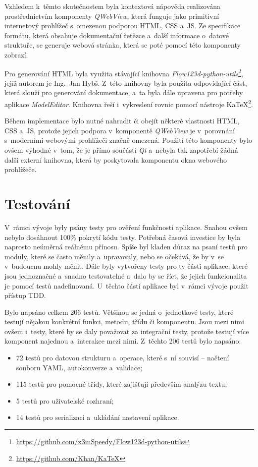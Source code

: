 \documentclass[FM,bw,DP]{tulthesis}
\begin{document}
Vzhledem k~těmto skutečnostem byla kontextová nápověda realizována pro\-střed\-nictvím komponenty \textit{QWebView}, která funguje jako primitivní internetový prohlížeč s~omezenou podporou \gls{HTML}, \gls{CSS} a~\gls{JS}. Ze specifikace formátu, která obsahuje dokumentační řetězce a~další informace o~datové struktuře, se generuje webová stránka, která se poté pomocí této komponenty zobrazí.

Pro generování HTML byla využita stávající knihovna \textit{Flow123d-python-utils\footnote{\url{https://github.com/x3mSpeedy/Flow123d-python-utils}}}, jejíž autorem je Ing.~Jan Hybš. Z~této knihovny byla použita odpovídající část, která slouží pro generování dokumentace, a~ta byla dále upravena pro potřeby aplikace \textit{ModelEditor}. Knihovna řeší i~vykreslení rovnic pomocí nástroje KaTeX\footnote{\url{https://github.com/Khan/KaTeX}}.

Během implementace bylo nutné nahradit či obejít některé vlastnosti \gls{HTML}, \gls{CSS} a~\gls{JS}, protože jejich podpora v~komponentě \textit{QWebView} je v~porovnání s~moderními webovými prohlížeči značně omezená. Použití této komponenty bylo ovšem výhodné v~tom, že je přímo součástí \textit{Qt} a~nebyla tak zapotřebí žádná další externí knihovna, která by poskytovala komponentu okna webového prohlížeče.

\section{Testování}

V~rámci vývoje byly psány testy pro ověření funkčnosti aplikace. Snahou ovšem nebylo dosáhnout 100\% pokrytí kódu testy. Potřebná časová investice by byla naprosto neúměrná reálnému přínosu. Spíše byl kladen důraz na psaní testů pro moduly, které se často měnily a~upravovaly, nebo se očekává, že by v~se v~budoucnu mohly měnit. Dále byly vytvořeny testy pro ty části aplikace, které jsou jednoznačné a~snadno testovatelné a~dalo by se říct, že jejich funkcionalita je pomocí testů nadefinovaná. U~těchto částí aplikace byl v~rámci vývoje použit přístup \gls{TDD}.

Bylo napsáno celkem 206 testů. Většinou se jedná o~jednotkové testy, které testují nějakou konkrétní funkci, metodu, třídu či komponentu. Jsou mezi nimi ovšem i~testy, které by se daly považovat za integrační testy, protože testují více komponent najednou a~interakce mezi nimi. Z~těchto 206 testů bylo napsáno:

\begin{itemize}
\item 72 testů pro datovou strukturu a~operace, které s~ní souvisí -- načtení souboru \gls{YAML}, autokonverze a~validace;
\item 115 testů pro pomocné třídy, které zajišťují především analýzu textu;
\item 5 testů pro uživatelské rozhraní;
\item 14 testů pro serializaci a~ukládání nastavení aplikace.
\end{itemize}
\end{document}
